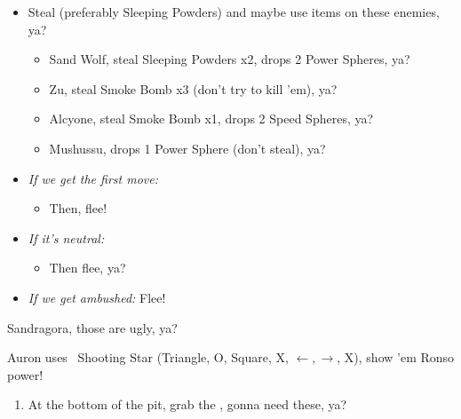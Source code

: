 \begin{encounters}
    \begin{itemize}
        \item Steal (preferably Sleeping Powders) and maybe use items on these enemies, ya?
        \begin{itemize}
            \item Sand Wolf, steal Sleeping Powders x2, drops 2 Power Spheres, ya?
            \item Zu, steal Smoke Bomb x3 (don't try to kill 'em), ya?
            \item Alcyone, steal Smoke Bomb x1, drops 2 Speed Spheres, ya?
            \item Mushussu, drops 1 Power Sphere (don't steal), ya?
        \end{itemize}
        \item \textit{If we get the first move:}
        \begin{itemize}
            \tidusf Tidus defends, ya?
            \rikkuf Rikku...Rikku?!... steals or uses a Smoke Bomb / Silence Grenade / Sleeping Powder, ya?
            \luluf Lulu defends, ya?
            \item Then, flee!
        \end{itemize}
        \item \textit{If it's neutral:}
        \begin{itemize}
            \switch{\tidus}{\kimahri}
            \kimahrif Kimahri steals, ya?
            \rikkuf Rikku...Rikku?!... switches for Tidus or uses a Smoke Bomb / Silence Grenade / Sleeping Powder, ya?
            \item Then flee, ya?
        \end{itemize}
        \item \textit{If we get ambushed:} Flee!
    \end{itemize}
\end{encounters}
\begin{battle}{Sandragora, those are ugly, ya?}
    \begin{itemize}
        \switch{\tidus}{\auron}
        \auronf Auron uses \od\ Shooting Star (Triangle, O, Square, X, $\leftarrow, \rightarrow$, X), show 'em Ronso power!
    \end{itemize}
\end{battle}
\begin{enumerate}[resume]
    \item At the bottom of the pit, grab the , gonna need these, ya?
\end{enumerate}
